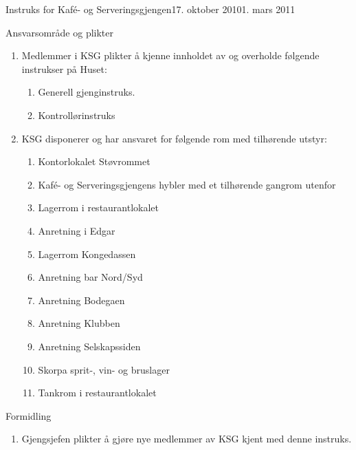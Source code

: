 \documentclass[../fsbok.tex]{subfiles}
\begin{document}
\begin{instruks}{Instruks for Kaf\'e- og Serveringsgjengen}{17. oktober 2010}{1. mars 2011}
    \begin{instruksledd}{Ansvarsområde og plikter}
        \begin{enumerate}
            \item  Medlemmer i KSG plikter å kjenne innholdet av og overholde følgende instrukser på
                Huset:
                \begin{enumerate}
                    \item Generell gjenginstruks.
                    \item Kontrollørinstruks
                \end{enumerate}
            \item KSG disponerer og har ansvaret for følgende rom med tilhørende utstyr:
                \begin{enumerate}
                    \item Kontorlokalet Støvrommet
                    \item Kafé- og Serveringsgjengens hybler med et tilhørende gangrom utenfor
                    \item Lagerrom i restaurantlokalet
                    \item Anretning i Edgar
                    \item Lagerrom Kongedassen
                    \item Anretning bar Nord/Syd
                    \item Anretning Bodegaen
                    \item Anretning Klubben
                    \item Anretning Selskapssiden
                    \item Skorpa sprit-, vin- og bruslager
                    \item Tankrom i restaurantlokalet
                \end{enumerate}
        \end{enumerate}
    \end{instruksledd}

    \begin{instruksledd}{Formidling}
        \begin{enumerate}
            \item Gjengsjefen plikter å gjøre nye medlemmer av KSG kjent med denne instruks.
        \end{enumerate}
    \end{instruksledd}

\end{instruks}
\end{document}

